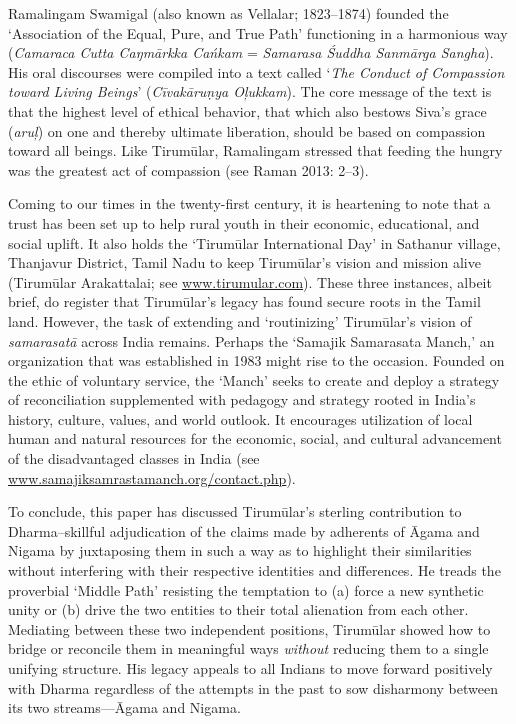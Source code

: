 Ramalingam Swamigal (also known as Vellalar; 1823–1874) founded the ‘Association of the Equal, Pure, and True Path’ functioning in a harmonious way (\textit{Camaraca Cutta Caŋmārkka Cańkam} = \textit{Samarasa Śuddha Sanmārga Sangha}). His oral discourses were compiled into a text called ‘\textit{The Conduct of Compassion toward Living Beings}’ (\textit{Cīvakāruṇya Oļukkam}). The core message of the text is that the highest level of ethical behavior, that which also bestows Siva’s grace (\textit{aruļ}) on one and thereby ultimate liberation, should be based on compassion toward all beings. Like Tirumūlar, Ramalingam stressed that feeding the hungry was the greatest act of compassion (see Raman 2013: 2–3).

Coming to our times in the twenty-first century, it is heartening to note that a trust has been set up to help rural youth in their economic, educational, and social uplift. It also holds the ‘Tirumūlar International Day’ in Sathanur village, Thanjavur District, Tamil Nadu to keep Tirumūlar’s vision and mission alive (Tirumūlar Arakattalai; see \url{www.tirumular.com}). These three instances, albeit brief, do register that Tirumūlar’s legacy has found secure roots in the Tamil land. However, the task of extending and ‘routinizing’ Tirumūlar’s vision of \textit{samarasatā} across India remains. Perhaps the ‘Samajik Samarasata Manch,’ an organization that was established in 1983 might rise to the occasion. Founded on the ethic of voluntary service, the ‘Manch’ seeks to create and deploy a strategy of reconciliation supplemented with pedagogy and strategy rooted in India’s history, culture, values, and world outlook. It encourages utilization of local human and natural resources for the economic, social, and cultural advancement of the disadvantaged classes in India (see \url{www.samajiksamrastamanch.org/contact.php}).

To conclude, this paper has discussed Tirumūlar’s sterling contribution to Dharma--skillful adjudication of the claims made by adherents of Āgama and Nigama by juxtaposing them in such a way as to highlight their similarities without interfering with their respective identities and differences. He treads the proverbial ‘Middle Path’ resisting the temptation to (a) force a new synthetic unity or (b) drive the two entities to their total alienation from each other. Mediating between these two independent positions, Tirumūlar showed how to bridge or reconcile them in meaningful ways \textit{without} reducing them to a single unifying structure. His legacy appeals to all Indians to move forward positively with Dharma regardless of the attempts in the past to sow disharmony between its two streams—Āgama and Nigama.


